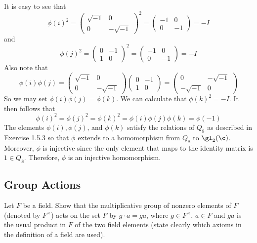 \begin{sol}
    It is easy to see that
    \[\phi(i)^2 = 
    \begin{pmatrix}
        \sqrt{-1} & 0 \\
        0 & -\sqrt{-1}
    \end{pmatrix}^2 = 
    \begin{pmatrix}
        -1 & 0 \\
        0 & -1
    \end{pmatrix} = -I
    \]
    and
    \[\phi(j)^2 =
    \begin{pmatrix}
        0 & -1 \\
        1 & 0
    \end{pmatrix}^2 = 
    \begin{pmatrix}
        -1 & 0 \\
        0 & -1
    \end{pmatrix} = -I
    \]
    Also note that
    \[\phi(i)\phi(j) = 
    \begin{pmatrix}
        \sqrt{-1} & 0 \\
        0 & -\sqrt{-1}
    \end{pmatrix}
    \begin{pmatrix}
        0 & -1 \\
        1 & 0
    \end{pmatrix} = 
    \begin{pmatrix}
        0 & -\sqrt{-1} \\
        -\sqrt{-1} & 0
    \end{pmatrix}\]
    So we may set $\phi(i)\phi(j) = \phi(k)$. We can calculate that $\phi(k)^2 = -I$. It then follows that
    \[\phi(i)^2 = \phi(j)^2 = \phi(k)^2 = \phi(i)\phi(j)\phi(k) = \phi(-1)\]
    The elements $\phi(i), \phi(j)$, and $\phi(k)$ satisfy the relations of $Q_8$ as described in \hyperref[ex1.5.3]{Exercise 1.5.3} so that $\phi$ extends to a homomorphism from $Q_8$ to $\gl_2(\c)$. Moreover, $\phi$ is injective since the only element that maps to the identity matrix is $1 \in Q_8$. Therefore, $\phi$ is an injective homomorphism.
\end{sol}

\newpage

\subsection{Group Actions}

\begin{exercise}\label{ex1.7.1}
    Let $F$ be a field. Show that the multiplicative group of nonzero elements of $F$ (denoted by $F^\times$) acts on the set $F$ by $g\cdot a = g a$, where $g\in F^\times$, $a\in F$ and $ga$ is the usual product in $F$ of the two field elements (state clearly which axioms in the definition of a field are used). 
\end{exercise}

